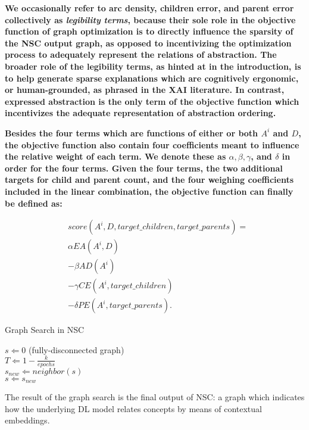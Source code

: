\textbf{We occasionally refer to arc density, children error, and parent error collectively as \textit{legibility terms}, because their sole role in the objective function of graph optimization is to directly influence the sparsity of the NSC output graph, as opposed to incentivizing the optimization process to adequately represent the relations of abstraction. The broader role of the legibility terms, as hinted at in the introduction, is to help generate sparse explanations which are cognitively ergonomic, or human-grounded, as phrased in the XAI literature. In contrast, expressed abstraction is the only term of the objective function which incentivizes the adequate representation of abstraction ordering.}

\textbf{Besides the four terms which are functions of either or both $A^i$ and $D$, the objective function also contain four coefficients meant to influence the relative weight of each term. We denote these as $\alpha, \beta, \gamma$, and $\delta$ in order for the four terms. Given the four terms, the two additional targets for child and parent count, and the four weighing coefficients included in the linear combination, the objective function can finally be defined as:}

\begin{align*}
    & score(A^i, D, target\_children, target\_parents) = \\
    & \alpha EA(A^i, D) \\
    & - \beta AD(A^i) \\
    & - \gamma CE(A^i, target\_children) \\
    & - \delta PE(A^i, target\_parents).
\end{align*}

\begin{algorithm}[!tbp] 
    \caption{Graph Search in NSC}
    \label{alg:gs}
    \begin{algorithmic}
        \STATE $s \Leftarrow 0 $ (fully-disconnected graph) \\
        \STATE $T \Leftarrow 1 - \frac{k}{epochs}$ \\
        \STATE $s_{new} \Leftarrow neighbor(s)$ \\
            \STATE $s \Leftarrow s_{new}$
        \ENDIF
        \ENDFOR
    \end{algorithmic}
\end{algorithm}

The result of the graph search is the final output of NSC: a graph which indicates how the underlying DL model relates concepts by means of contextual embeddings.

